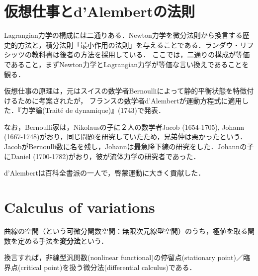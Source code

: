 \documentclass[uplatex, 12pt, dvipdfmx]{jsreport}
\begin{document}
\section{仮想仕事とd'Alembertの法則}

\begin{screen}
    Lagrangian力学の構成には二通りある．Newton力学を微分法則から換言する歴史的方法と，積分法則「最小作用の法則」を与えることである．ランダウ・リフシッツの教科書は後者の方法を採用している．
    ここでは，二通りの構成が等価であること，まずNewton力学とLagrangian力学が等価な言い換えであることを観る．
\end{screen}

\begin{axiom}

\end{axiom}
\begin{remark}
    仮想仕事の原理は，元はスイスの数学者Bernoulliによって静的平衡状態を特徴付けるために考案されたが，
    フランスの数学者d'Alembertが運動方程式に適用した．『力学論(Traité de dynamique)』(1743)で発表．

    なお，Bernoulli家は，Nikolausの子に２人の数学者Jacob (1654-1705), Johann (1667-1748)がおり，同じ問題を研究していたため，兄弟仲は悪かったという．
    JacobがBernoulli数に名を残し，Johannは最急降下線の研究をした．Johannの子にDaniel (1700-1782)がおり，彼が流体力学の研究者であった．

    d'Alembertは百科全書派の一人で，啓蒙運動に大きく貢献した．
\end{remark}

\section{Calculus of variations}

\begin{definition}
    曲線の空間（という可微分関数空間：無限次元線型空間）のうち，極値を取る関数を定める手法を\textbf{変分法}という．

    換言すれば，非線型汎関数(nonlinear functional)の停留点(stationary point)／臨界点(critical point)を扱う微分法(differential calculus)である．
\end{definition}
\end{document}
